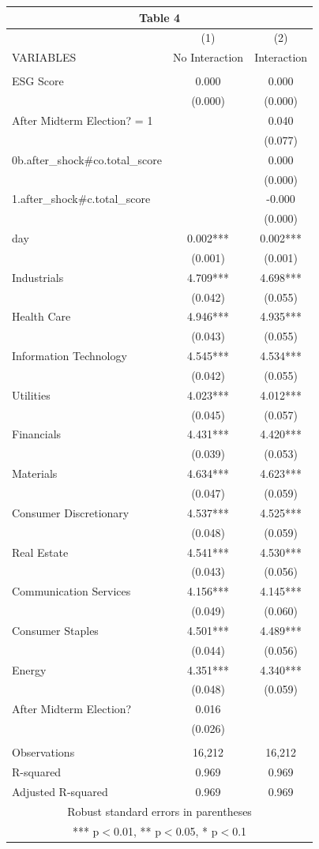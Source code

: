 \begin{tabular}{lcc}
\multicolumn{3}{c}{Table 4} \\ \hline
 & (1) & (2) \\
VARIABLES & No Interaction & Interaction \\ \hline
 &  &  \\
ESG Score & 0.000 & 0.000 \\
 & (0.000) & (0.000) \\
After Midterm Election? = 1 &  & 0.040 \\
 &  & (0.077) \\
0b.after\_shock\#co.total\_score &  & 0.000 \\
 &  & (0.000) \\
1.after\_shock\#c.total\_score &  & -0.000 \\
 &  & (0.000) \\
day & 0.002*** & 0.002*** \\
 & (0.001) & (0.001) \\
Industrials & 4.709*** & 4.698*** \\
 & (0.042) & (0.055) \\
Health Care & 4.946*** & 4.935*** \\
 & (0.043) & (0.055) \\
Information Technology & 4.545*** & 4.534*** \\
 & (0.042) & (0.055) \\
Utilities & 4.023*** & 4.012*** \\
 & (0.045) & (0.057) \\
Financials & 4.431*** & 4.420*** \\
 & (0.039) & (0.053) \\
Materials & 4.634*** & 4.623*** \\
 & (0.047) & (0.059) \\
Consumer Discretionary & 4.537*** & 4.525*** \\
 & (0.048) & (0.059) \\
Real Estate & 4.541*** & 4.530*** \\
 & (0.043) & (0.056) \\
Communication Services & 4.156*** & 4.145*** \\
 & (0.049) & (0.060) \\
Consumer Staples & 4.501*** & 4.489*** \\
 & (0.044) & (0.056) \\
Energy & 4.351*** & 4.340*** \\
 & (0.048) & (0.059) \\
After Midterm Election? & 0.016 &  \\
 & (0.026) &  \\
 &  &  \\
Observations & 16,212 & 16,212 \\
R-squared & 0.969 & 0.969 \\
 Adjusted R-squared & 0.969 & 0.969 \\ \hline
\multicolumn{3}{c}{ Robust standard errors in parentheses} \\
\multicolumn{3}{c}{ *** p$<$0.01, ** p$<$0.05, * p$<$0.1} \\
\end{tabular}
